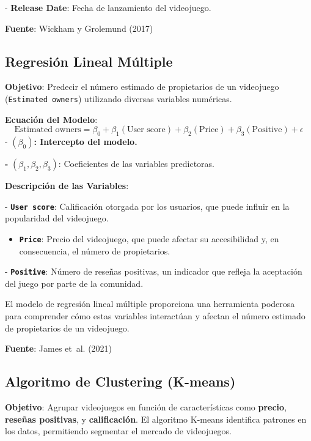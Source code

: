 \documentclass[
  letterpaper,
  DIV=11,
  numbers=noendperiod]{scrreprt}
\providecommand{\tightlist}{%
  \setlength{\itemsep}{0pt}\setlength{\parskip}{0pt}}\usepackage{longtable,booktabs,array}
\begin{document}
- \textbf{Release Date}: Fecha de lanzamiento del videojuego.

\textbf{Fuente}: Wickham y Grolemund (2017)

\subsection{Regresión Lineal
Múltiple}\label{regresiuxf3n-lineal-muxfaltiple}

\textbf{Objetivo}: Predecir el número estimado de propietarios de un
videojuego (\texttt{Estimated\ owners}) utilizando diversas variables
numéricas.

\textbf{Ecuación del Modelo}: \[
\text{Estimated owners} = \beta_0 + \beta_1 (\text{User score}) + \beta_2 (\text{Price}) + \beta_3 (\text{Positive}) + \epsilon
\] - \((\beta_0)\)\textbf{: Intercepto del modelo.}

\textbf{-} \((\beta_1, \beta_2, \beta_3)\): Coeficientes de las
variables predictoras.

\textbf{Descripción de las Variables}:

- \textbf{\texttt{User\ score}}: Calificación otorgada por los usuarios,
que puede influir en la popularidad del videojuego.

\begin{itemize}
\tightlist
\item
  \textbf{\texttt{Price}}: Precio del videojuego, que puede afectar su
  accesibilidad y, en consecuencia, el número de propietarios.
\end{itemize}

- \textbf{\texttt{Positive}}: Número de reseñas positivas, un indicador
que refleja la aceptación del juego por parte de la comunidad.

El modelo de regresión lineal múltiple proporciona una herramienta
poderosa para comprender cómo estas variables interactúan y afectan el
número estimado de propietarios de un videojuego.

\textbf{Fuente}: James et~al. (2021)

\subsection{Algoritmo de Clustering
(K-means)}\label{algoritmo-de-clustering-k-means}

\textbf{Objetivo}: Agrupar videojuegos en función de características
como \textbf{precio}, \textbf{reseñas positivas}, y
\textbf{calificación}. El algoritmo K-means identifica patrones en los
datos, permitiendo segmentar el mercado de videojuegos.
\end{document}
